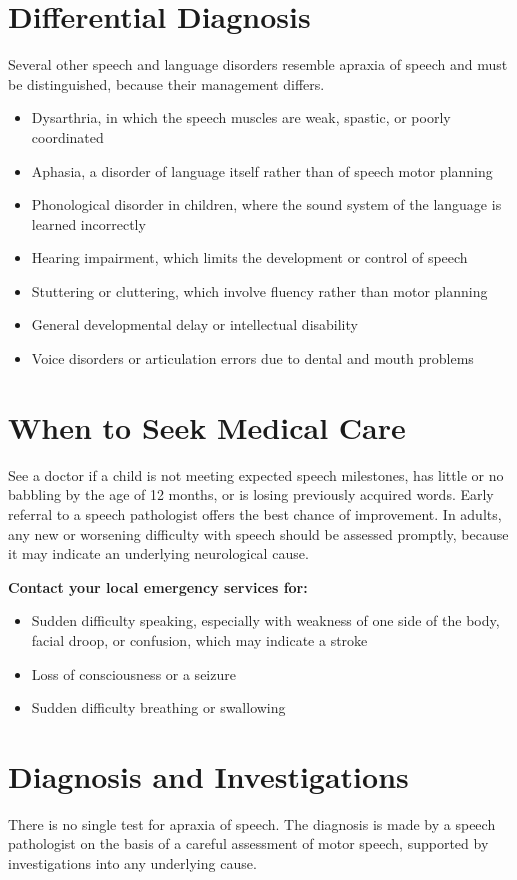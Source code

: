 \section*{Differential Diagnosis}
Several other speech and language disorders resemble apraxia of speech and must be distinguished, because their management differs.

\begin{itemize}
    \item Dysarthria, in which the speech muscles are weak, spastic, or poorly coordinated
    \item Aphasia, a disorder of language itself rather than of speech motor planning
    \item Phonological disorder in children, where the sound system of the language is learned incorrectly
    \item Hearing impairment, which limits the development or control of speech
    \item Stuttering or cluttering, which involve fluency rather than motor planning
    \item General developmental delay or intellectual disability
    \item Voice disorders or articulation errors due to dental and mouth problems
\end{itemize}

\section*{When to Seek Medical Care}
See a doctor if a child is not meeting expected speech milestones, has little or no babbling by the age of 12 months, or is losing previously acquired words. Early referral to a speech pathologist offers the best chance of improvement. In adults, any new or worsening difficulty with speech should be assessed promptly, because it may indicate an underlying neurological cause.

\textbf{Contact your local emergency services for:}
\begin{itemize}
    \item Sudden difficulty speaking, especially with weakness of one side of the body, facial droop, or confusion, which may indicate a stroke
    \item Loss of consciousness or a seizure
    \item Sudden difficulty breathing or swallowing
\end{itemize}

\section*{Diagnosis and Investigations}
There is no single test for apraxia of speech. The diagnosis is made by a speech pathologist on the basis of a careful assessment of motor speech, supported by investigations into any underlying cause.

